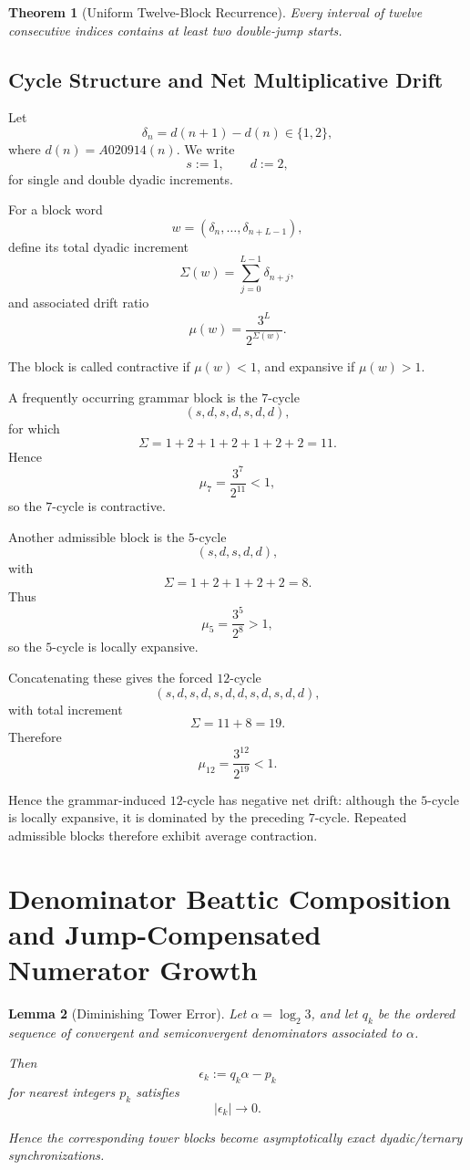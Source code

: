 \documentclass[12pt, oneside]{article}
\numberwithin{equation}{section}
\theoremstyle{definition}
\theoremstyle{plain}
\newtheorem{theorem}{Theorem}[section]
\newtheorem{lemma}[theorem]{Lemma}
\theoremstyle{remark}
\begin{document}
\begin{theorem}[Uniform Twelve-Block Recurrence]
Every interval of twelve consecutive indices contains at least two
double-jump starts.
\end{theorem}


\subsection{Cycle Structure and Net Multiplicative Drift}

Let
\[
\delta_n=d(n+1)-d(n)\in\{1,2\},
\]
where $d(n)=A020914(n)$.
We write
\[
s:=1,\qquad d:=2,
\]
for single and double dyadic increments.

For a block word
\[
w=(\delta_n,\dots,\delta_{n+L-1}),
\]
define its total dyadic increment
\[
\Sigma(w)=\sum_{j=0}^{L-1}\delta_{n+j},
\]
and associated drift ratio
\[
\mu(w)=\frac{3^L}{2^{\Sigma(w)}}.
\]

The block is called contractive if $\mu(w)<1$, and expansive if $\mu(w)>1$.

A frequently occurring grammar block is the $7$-cycle
\[
(s,d,s,d,s,d,d),
\]
for which
\[
\Sigma=1+2+1+2+1+2+2=11.
\]
Hence
\[
\mu_7=\frac{3^7}{2^{11}}<1,
\]
so the $7$-cycle is contractive.

Another admissible block is the $5$-cycle
\[
(s,d,s,d,d),
\]
with
\[
\Sigma=1+2+1+2+2=8.
\]
Thus
\[
\mu_5=\frac{3^5}{2^8}>1,
\]
so the $5$-cycle is locally expansive.

Concatenating these gives the forced $12$-cycle
\[
(s,d,s,d,s,d,d,s,d,s,d,d),
\]
with total increment
\[
\Sigma=11+8=19.
\]
Therefore
\[
\mu_{12}=\frac{3^{12}}{2^{19}}<1.
\]

Hence the grammar-induced $12$-cycle has negative net drift:
although the $5$-cycle is locally expansive, it is dominated by the
preceding $7$-cycle. Repeated admissible blocks therefore exhibit
average contraction.

\section{Denominator Beattic Composition and Jump-Compensated Numerator Growth}

\begin{lemma}[Diminishing Tower Error]
Let $\alpha=\log_2 3$, and let $q_k$ be the ordered sequence of convergent and semiconvergent denominators associated to $\alpha$.

Then
\[
\epsilon_k := q_k\alpha - p_k
\]
for nearest integers $p_k$ satisfies
\[
|\epsilon_k|\to 0.
\]

Hence the corresponding tower blocks become asymptotically exact dyadic/ternary synchronizations.
\end{lemma}
\end{document}
